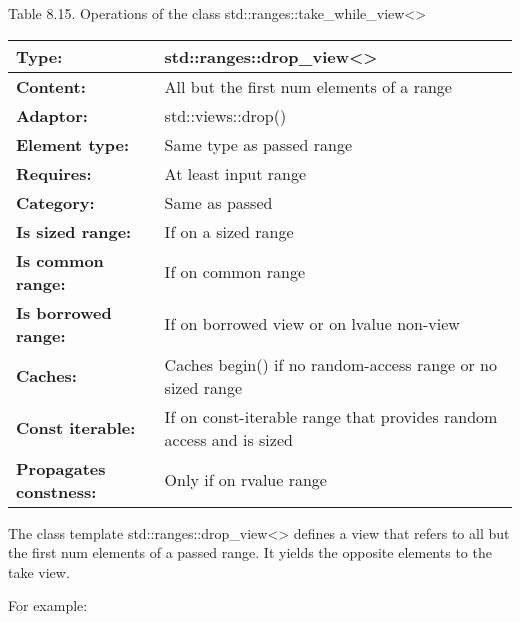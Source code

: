 \begin{center}
Table 8.15. Operations of the class std::ranges::take\_while\_view<>
\end{center}


\begin{longtable}[c]{|l|l|}
\hline
\textbf{Type:}                 & std::ranges::drop\_view\textless{}\textgreater{} \\ \hline
\endfirsthead
%
\endhead
%
\textbf{Content:}              & All but the first num elements of a range        \\ \hline
\textbf{Adaptor:}              & std::views::drop()                               \\ \hline
\textbf{Element type:}         & Same type as passed range                        \\ \hline
\textbf{Requires:}             & At least input range                             \\ \hline
\textbf{Category:}             & Same as passed                                   \\ \hline
\textbf{Is sized range:}       & If on a sized range                              \\ \hline
\textbf{Is common range:}      & If on common range                               \\ \hline
\textbf{Is borrowed range:} & If on borrowed view or on lvalue non-view                           \\ \hline
\textbf{Caches:}            & Caches begin() if no random-access range or no sized range          \\ \hline
\textbf{Const iterable:}    & If on const-iterable range that provides random access and is sized \\ \hline
\textbf{Propagates constness:} & Only if on rvalue range                          \\ \hline
\end{longtable}

The class template std::ranges::drop\_view<> defines a view that refers to all but the first num elements of a passed range. It yields the opposite elements to the take view.

For example:

